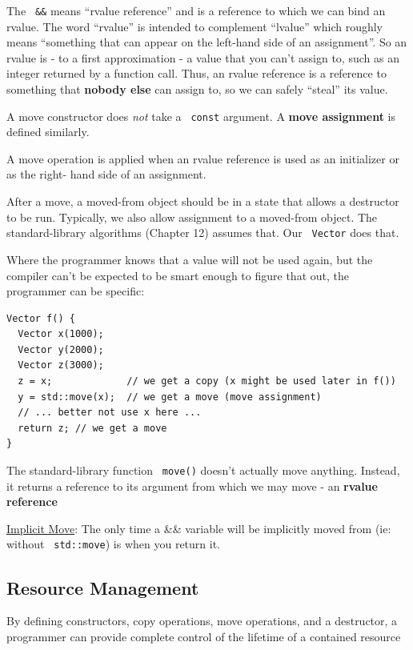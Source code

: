 \documentclass[11pt]{article}
\let\OldTexttt\texttt
\renewcommand{\texttt}[1]{\OldTexttt{\color{MidnightBlue} #1}}
\begin{document}
The \texttt{\&\&} means ``rvalue reference'' and is a reference to which we can bind an rvalue. The word
``rvalue'' is intended to complement ``lvalue'' which roughly means ``something that can appear on
the left-hand side of an assignment''. So an rvalue is - to a first approximation - a value that
you can't assign to, such as an integer returned by a function call. Thus, an rvalue reference
is a reference to something that \textbf{nobody else} can assign to, so we can safely ``steal'' its value.

A move constructor does \emph{not} take a \texttt{const} argument. A \textbf{move assignment} is defined similarly.

A move operation is applied when an rvalue reference is used as an initializer or as the right-
hand side of an assignment.

After a move, a moved-from object should be in a state that allows a destructor to be run.
Typically, we also allow assignment to a moved-from object. The standard-library algorithms
(Chapter 12) assumes that. Our \texttt{Vector} does that.

Where the programmer knows that a value will not be used again, but the compiler can’t be
expected to be smart enough to figure that out, the programmer can be specific:
\begin{verbatim}
Vector f() {
  Vector x(1000);
  Vector y(2000);
  Vector z(3000);
  z = x;             // we get a copy (x might be used later in f())
  y = std::move(x);  // we get a move (move assignment)
  // ... better not use x here ...
  return z; // we get a move
}
\end{verbatim}

The standard-library function \texttt{move()} doesn't actually move anything. Instead, it returns a
reference to its argument from which we may move - an \textbf{rvalue reference}

\href{https://stackoverflow.com/questions/9779079/why-does-c11-have-implicit-moves-for-value-parameters-but-not-for-rvalue-para}{Implicit Move}: The only time a \&\& variable will be implicitly moved from (ie: without \texttt{std::move})
is when you return it.
\subsection{Resource Management}
\label{sec:orgb04cdcc}

By defining constructors, copy operations, move operations, and a destructor, a programmer can
provide complete control of the lifetime of a contained resource
\end{document}
